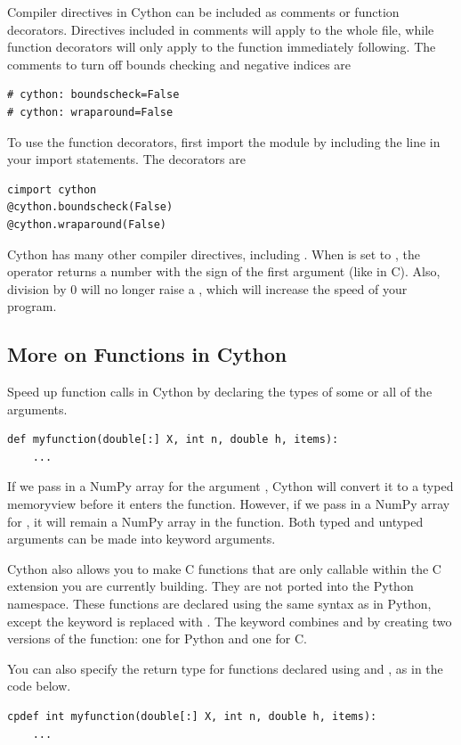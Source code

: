 Compiler directives in Cython can be included as comments or function decorators.
Directives included in comments will apply to the whole file, while function decorators will only apply to the function immediately following.
The comments to turn off bounds checking and negative indices are
\begin{lstlisting}
# cython: boundscheck=False
# cython: wraparound=False
\end{lstlisting}
To use the function decorators, first import the  module by including the line  in your import statements.
The decorators are
\begin{lstlisting}
cimport cython
@cython.boundscheck(False)
@cython.wraparound(False)
\end{lstlisting}

Cython has many other compiler directives, including .
When  is set to , the \li{\%} operator returns a number with the sign of the first argument (like in C).
Also, division by 0 will no longer raise a , which will increase the speed of your program.

\subsection*{More on Functions in Cython}
Speed up function calls in Cython by declaring the types of some or all of the arguments.
\begin{lstlisting}
def myfunction(double[:] X, int n, double h, items):
    ...
\end{lstlisting}
If we pass in a NumPy array for the argument , Cython will convert it to a typed memoryview before it enters the function.
However, if we pass in a NumPy array for , it will remain a NumPy array in the function.
Both typed and untyped arguments can be made into keyword arguments.

Cython also allows you to make C functions that are only callable within the C extension you are currently building.
They are not ported into the Python namespace.
These functions are declared using the same syntax as in Python, except the keyword  is replaced with .
The keyword  combines  and  by creating two versions of the function: one for Python and one for C.

You can also specify the return type for functions declared using  and , as in the code below.
\begin{lstlisting}
cpdef int myfunction(double[:] X, int n, double h, items):
    ...
\end{lstlisting}

